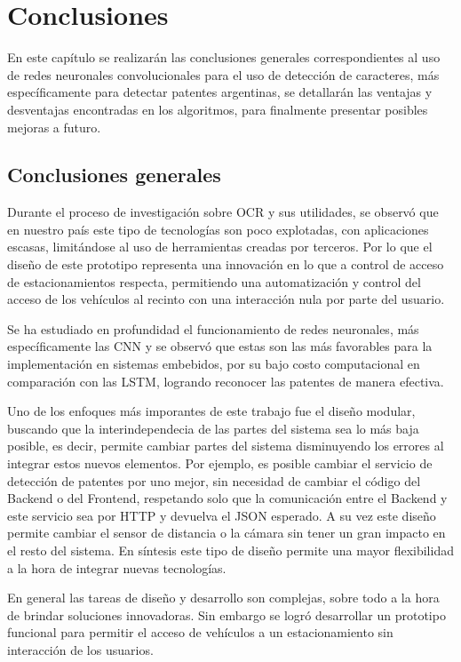\chapter{Conclusiones}
En este capítulo se realizarán las conclusiones generales correspondientes al uso de redes neuronales convolucionales para el uso de detección de caracteres, más específicamente para detectar patentes argentinas, se detallarán las ventajas y desventajas encontradas en los algoritmos, para finalmente presentar posibles mejoras a futuro.

\section{Conclusiones generales}

Durante el proceso de investigación sobre OCR y sus utilidades, se observó que en nuestro país este tipo de tecnologías son poco explotadas, con aplicaciones escasas, limitándose al uso de herramientas creadas por terceros.
Por lo que el diseño de este prototipo representa una innovación en lo que a control de acceso de estacionamientos respecta, permitiendo una automatización y control del acceso de los vehículos al recinto con una interacción nula por parte del usuario.

Se ha estudiado en profundidad el funcionamiento de redes neuronales, más específicamente las CNN y se observó que estas son las más favorables para la implementación en sistemas embebidos, por su bajo costo computacional en comparación con las LSTM, logrando reconocer las patentes de manera efectiva.

Uno de los enfoques más imporantes de este trabajo fue el diseño modular, buscando que la interindependecia de las partes del sistema sea lo más baja posible, es decir, permite cambiar partes del sistema disminuyendo los errores al integrar estos nuevos elementos.
Por ejemplo, es posible cambiar el servicio de detección de patentes por uno mejor, sin necesidad de cambiar el código del Backend o del Frontend, respetando solo que la comunicación entre el Backend y este servicio sea por HTTP y devuelva el JSON esperado.
A su vez este diseño permite cambiar el sensor de distancia o la cámara sin tener un gran impacto en el resto del sistema.
En síntesis este tipo de diseño permite una mayor flexibilidad a la hora de integrar nuevas tecnologías.

En general las tareas de diseño y desarrollo son complejas, sobre todo a la hora de brindar soluciones innovadoras.
Sin embargo se logró desarrollar un prototipo funcional para permitir el acceso de vehículos a un estacionamiento sin interacción de los usuarios.

